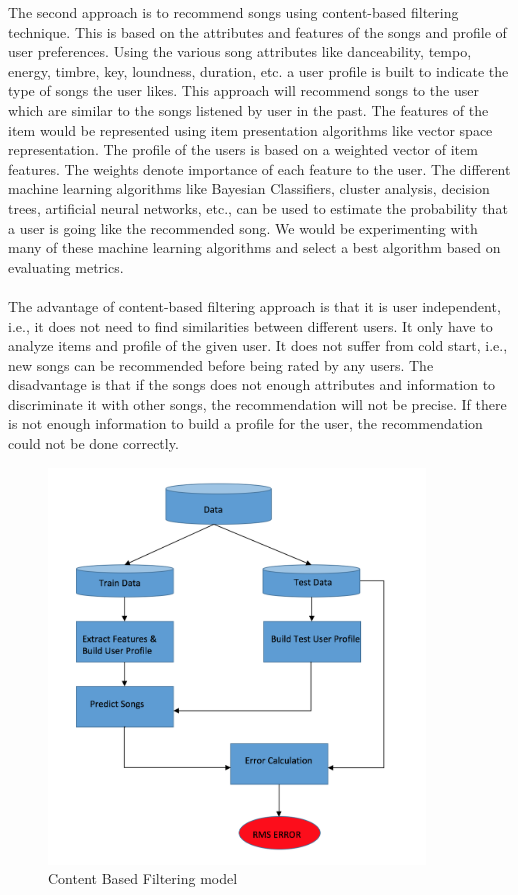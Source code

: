\documentclass{sig-alternate-05-2015}
\begin{document}
The second approach is to recommend songs using content-based filtering technique. This is based on the attributes and features of the songs and profile of user preferences. Using the various song attributes like danceability, tempo, energy, timbre, key, loundness, duration, etc. a user profile is built to indicate the type of songs the user likes. This approach will recommend songs to the user which are similar to the songs listened by user in the past. The features of the item would be represented using item presentation algorithms like vector space representation. The profile of the users is based on a weighted vector of item features. The weights denote importance of each feature to the user. The different machine learning algorithms like Bayesian Classifiers, cluster analysis, decision trees, artificial neural networks, etc., can be used to estimate the probability that a user is going like the recommended song. We would be experimenting with many of these machine learning algorithms and select a best algorithm based on evaluating metrics.\\\\
The advantage of content-based filtering approach is that it is user independent, i.e., it does not need to find similarities between different users. It only have to analyze items and profile of the given user. It does not suffer from cold start, i.e., new songs can be recommended before being rated by any users. The disadvantage is that if the songs does not enough attributes and information to discriminate it with other songs, the recommendation will not be precise. If there is not enough information to build a profile for the user, the recommendation could not be done correctly.

\begin{figure}[h]
    \centering
\includegraphics [width =10cm]{Images/ContentBasedFiltering.png}
    \caption{Content Based Filtering model}
\end{figure}
\end{document}
